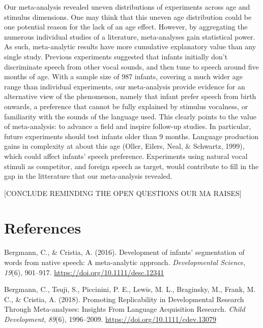 \documentclass[man]{apa6}
\begin{document}
Our meta-analysis revealed uneven distributions of experiments across
age and stimulus dimensions. One may think that this uneven age
distribution could be one potential reason for the lack of an age
effect. However, by aggregating the numerous individual studies of a
literature, meta-analyses gain statistical power. As such, meta-analytic
results have more cumulative explanatory value than any single study.
Previous experiments suggested that infants initially don't discriminate
speech from other vocal sounds, and then tune to speech around five
months of age. With a sample size of 987 infants, covering a much wider
age range than individual experiments, our meta-analysis provide
evidence for an alternative view of the phenomenon, namely that infant
prefer speech from birth onwards, a preference that cannot be fully
explained by stimulus vocalness, or familiarity with the sounds of the
language used. This clearly points to the value of meta-analysis: to
advance a field and inspire follow-up studies. In particular, future
experiments should test infants older than 9 months. Language production
gains in complexity at about this age (Oller, Eilers, Neal, \& Schwartz,
1999), which could affect infants' speech preference. Experiments using
natural vocal stimuli as competitor, and foreign speech as target, would
contribute to fill in the gap in the litterature that our meta-analysis
revealed.

{[}CONCLUDE REMINDING THE OPEN QUESTIONS OUR MA RAISES{]}

\newpage

\section{References}\label{references}

\begingroup
\setlength{\parindent}{-0.5in} \setlength{\leftskip}{0.5in}

\hypertarget{refs}{}
\hypertarget{ref-bergmann_development_2016}{}
Bergmann, C., \& Cristia, A. (2016). Development of infants'
segmentation of words from native speech: A meta-analytic approach.
\emph{Developmental Science}, \emph{19}(6), 901--917.
\url{https://doi.org/10.1111/desc.12341}

\hypertarget{ref-bergmann_promoting_2018}{}
Bergmann, C., Tsuji, S., Piccinini, P. E., Lewis, M. L., Braginsky, M.,
Frank, M. C., \& Cristia, A. (2018). Promoting Replicability in
Developmental Research Through Meta-analyses: Insights From Language
Acquisition Research. \emph{Child Development}, \emph{89}(6),
1996--2009. \url{https://doi.org/10.1111/cdev.13079}
\end{document}
